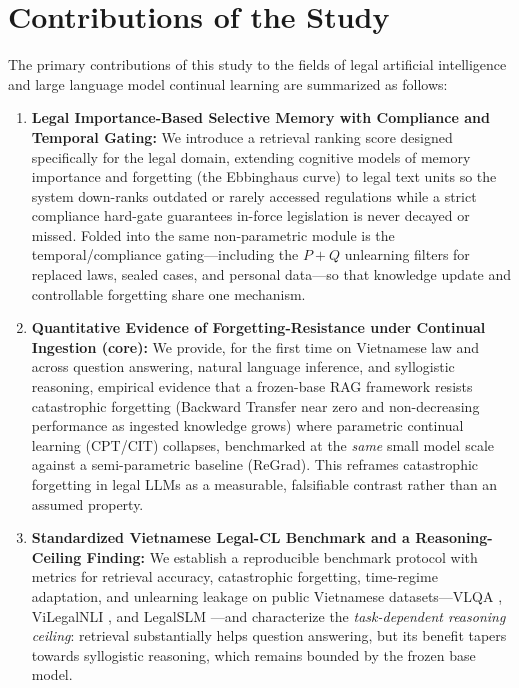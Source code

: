 \section{Contributions of the Study}

The primary contributions of this study to the fields of legal artificial intelligence and large language model continual learning are summarized as follows:
\begin{enumerate}
    \item \textbf{Legal Importance-Based Selective Memory with Compliance and Temporal Gating:} We introduce a retrieval ranking score designed specifically for the legal domain, extending cognitive models of memory importance and forgetting (the Ebbinghaus curve) to legal text units so the system down-ranks outdated or rarely accessed regulations while a strict compliance hard-gate guarantees in-force legislation is never decayed or missed. Folded into the same non-parametric module is the temporal/compliance gating---including the $P+Q$ unlearning filters for replaced laws, sealed cases, and personal data---so that knowledge update and controllable forgetting share one mechanism.
    \item \textbf{Quantitative Evidence of Forgetting-Resistance under Continual Ingestion (core):} We provide, for the first time on Vietnamese law and across question answering, natural language inference, and syllogistic reasoning, empirical evidence that a frozen-base RAG framework resists catastrophic forgetting (Backward Transfer near zero and non-decreasing performance as ingested knowledge grows) where parametric continual learning (CPT/CIT) collapses, benchmarked at the \emph{same} small model scale against a semi-parametric baseline (ReGrad). This reframes catastrophic forgetting in legal LLMs as a measurable, falsifiable contrast rather than an assumed property.
    \item \textbf{Standardized Vietnamese Legal-CL Benchmark and a Reasoning-Ceiling Finding:} We establish a reproducible benchmark protocol with metrics for retrieval accuracy, catastrophic forgetting, time-regime adaptation, and unlearning leakage on public Vietnamese datasets---VLQA \parencite{nguyen2025vlqacomprehensivelargehighquality}, ViLegalNLI \parencite{duong2026vilegalnlinaturallanguageinference}, and LegalSLM \parencite{le-etal-2025-overview}---and characterize the \emph{task-dependent reasoning ceiling}: retrieval substantially helps question answering, but its benefit tapers towards syllogistic reasoning, which remains bounded by the frozen base model.
\end{enumerate}
